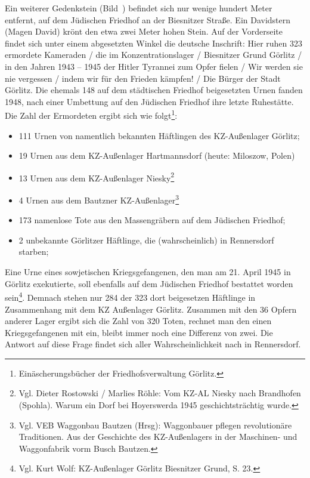 \documentclass[a4paper,12pt,ngerman,
]{nisebook}
\begin{document}

Ein weiterer Gedenkstein (Bild~)\label{leichen} befindet sich nur wenige hundert Meter entfernt, auf dem Jüdischen Friedhof an der Biesnitzer Straße. Ein Davidstern (Magen David) krönt den etwa zwei Meter hohen Stein. Auf der Vorderseite findet sich unter einem abgesetzten Winkel die deutsche Inschrift: \glqq Hier ruhen 323 ermordete Kameraden / die im Konzentrationslager / Biesnitzer Grund Görlitz / in den Jahren 1943 -- 1945
der Hitler Tyrannei zum Opfer fielen / Wir werden sie nie vergessen / indem wir für den Frieden kämpfen! / Die Bürger der Stadt Görlitz\grqq.\newline
Die ehemals 148 auf dem städtischen Friedhof beigesetzten Urnen fanden 1948, nach einer Umbettung auf den Jüdischen Friedhof ihre letzte Ruhestätte.  Die Zahl der Ermordeten ergibt sich wie folgt\footnote{Einäscherungsbücher der Friedhofsverwaltung Görlitz.}:
\begin{itemize}
\item 111 Urnen von namentlich bekannten Häftlingen des KZ-Außenlager Görlitz; 
\item 19 Urnen aus dem KZ-Außenlager Hartmannsdorf (heute: Miloszow, Polen)
\item 13 Urnen aus dem KZ-Außenlager Niesky\footnote{Vgl. Dieter Rostowski / Marlies Röhle: Vom KZ-AL Niesky nach Brandhofen (Spohla). Warum ein Dorf bei Hoyerswerda 1945 geschichtsträchtig wurde.}
\item 4 Urnen aus dem Bautzner KZ-Außenlager\footnote{Vgl. VEB Waggonbau Bautzen (Hrsg): Wag­gon­bauer pfle­gen re­vo­lu­tio­näre Tra­di­tio­nen. Aus der Ge­schichte des KZ-Außenlagers in der Maschinen- und Wag­gon­fa­brik vorm Busch Baut­zen.}
\item 173 namenlose Tote aus den Massengräbern auf dem Jüdischen Friedhof;
\item 2 unbekannte Görlitzer Häftlinge, die (wahrscheinlich) in Rennersdorf starben;
\end{itemize}
Eine Urne eines sowjetischen Kriegsgefangenen, den man am 21. April 1945 in Görlitz exekutierte, soll ebenfalls auf dem Jüdischen Friedhof bestattet worden sein\footnote{Vgl. Kurt Wolf: KZ-Außenlager Görlitz Biesnitzer Grund, S. 23.}. 
Demnach stehen nur 284 der 323 dort beigesetzen Häftlinge in Zusammenhang mit dem KZ Außenlager Görlitz. Zusammen mit den 36 Opfern anderer Lager ergibt sich die Zahl von 320 Toten, rechnet man den einen Kriegsgefangenen mit ein, bleibt immer noch eine Differenz von zwei. Die Antwort auf diese Frage findet sich aller Wahrscheinlichkeit nach in Rennersdorf.
\end{document}
